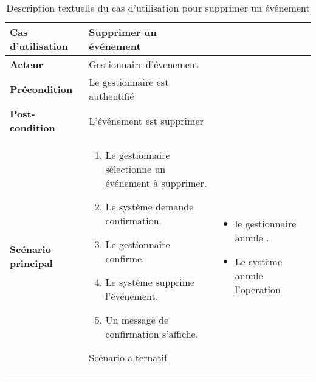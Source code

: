\begin{longtable}{|>{\bfseries}p{4cm}|p{10cm}|}
\hline
Cas d’utilisation & Supprimer un événement \\
\hline
Acteur & Gestionnaire d'évenement \\
\hline
Précondition & Le gestionnaire est authentifié \\
\hline
Post-condition & L’événement est supprimer \\
\hline
Scénario principal & 
\begin{enumerate}
  \item Le gestionnaire sélectionne un événement à supprimer.
  \item  Le système demande confirmation.
  \item Le gestionnaire confirme.
  \item Le système supprime l’événement.
  \item Un message de confirmation s’affiche.
\end{enumerate} 
\hline
Scénario alternatif & 
\begin{itemize}
  \item le gestionnaire annule  .
  \item Le système annule l'operation
\end{itemize} 
\hline
\caption{Description textuelle du cas d’utilisation pour  supprimer un événement}
\end{longtable}


